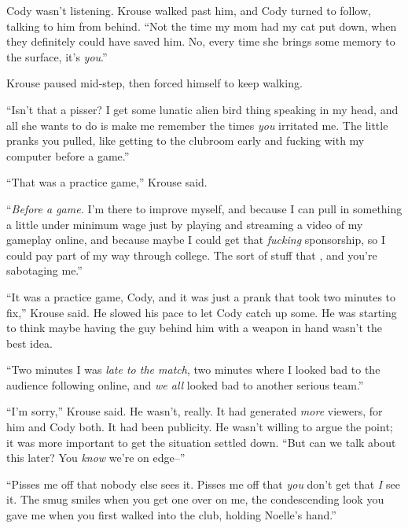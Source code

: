 Cody wasn't listening.  Krouse walked past him, and Cody turned to follow, talking to him from behind.  ``Not the time my mom had my cat put down, when they definitely could have saved him.  No, every time she brings some memory to the surface, it's \emph{you}.''



Krouse paused mid-step, then forced himself to keep walking.



``Isn't that a pisser?  I get some lunatic alien bird thing speaking in my head, and all she wants to do is make me remember the times \emph{you }irritated me.  The little pranks you pulled, like getting to the clubroom early and fucking with my computer before a game.''



``That was a practice game,'' Krouse said.



``\emph{Before a game.  }I'm there to improve myself, and because I can pull in something a little under minimum wage just by playing and streaming a video of my gameplay online, and because maybe I could get that \emph{fucking} sponsorship, so I could pay part of my way through college.  The sort of stuff that , and you're sabotaging me.''



``It was a practice game, Cody, and it was just a prank that took two minutes to fix,'' Krouse said.  He slowed his pace to let Cody catch up some.  He was starting to think maybe having the guy behind him with a weapon in hand wasn't the best idea.



``Two minutes I was \emph{late to the match}, two minutes where I looked bad to the audience following online, and \emph{we all} looked bad to another serious team.''



``I'm sorry,'' Krouse said.  He wasn't, really.  It had generated \emph{more} viewers, for him and Cody both.  It had been publicity.  He wasn't willing to argue the point; it was more important to get the situation settled down.  ``But can we talk about this later?  You \emph{know} we're on edge--''



``Pisses me off that nobody else sees it.  Pisses me off that \emph{you} don't get that \emph{I} see it.  The smug smiles when you get one over on me, the condescending look you gave me when you first walked into the club, holding Noelle's hand.''



